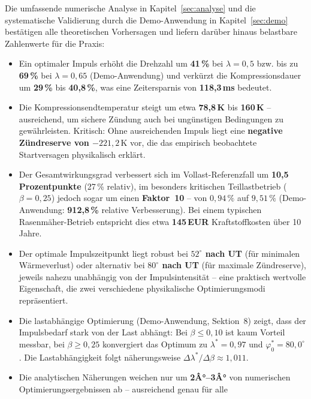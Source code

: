 ﻿\documentclass[a4paper,12pt]{article}
\begin{document}
Die umfassende numerische Analyse in Kapitel~\ref{sec:analyse} und die
systematische Validierung durch die Demo-Anwendung in Kapitel~\ref{sec:demo}
bestätigen alle theoretischen Vorhersagen und liefern darüber hinaus
belastbare Zahlenwerte für die Praxis:

\begin{itemize}
  \item Ein optimaler Impuls erhöht die Drehzahl um \textbf{41\,\%} bei
    $\lambda = 0{,}5$ bzw. bis zu \textbf{69\,\%} bei $\lambda = 0{,}65$
    (Demo-Anwendung) und verkürzt die Kompressionsdauer um \textbf{29\,\%}
    bis \textbf{40{,}8\,\%}, was eine Zeitersparnis von \textbf{118{,}3\,ms}
    bedeutet.
  \item Die Kompressionsendtemperatur steigt um etwa \textbf{78{,}8\,K} bis
    \textbf{160\,K} -- ausreichend, um sichere Zündung auch bei ungünstigen
    Bedingungen zu gewährleisten. Kritisch: Ohne ausreichenden Impuls liegt
    eine \textbf{negative Zündreserve von $-221{,}2\,\text{K}$} vor, die
    das empirisch beobachtete Startversagen physikalisch erklärt.
  \item Der Gesamtwirkungsgrad verbessert sich im Vollast-Referenzfall
    um \textbf{10{,}5 Prozentpunkte} (27\,\% relativ), im besonders
    kritischen Teillastbetrieb ($\beta = 0{,}25$) jedoch sogar um einen
    \textbf{Faktor~10} -- von $0{,}94\,\%$ auf $9{,}51\,\%$ (Demo-Anwendung:
    \textbf{912{,}8\,\%} relative Verbesserung). Bei einem typischen
    Rasenmäher-Betrieb entspricht dies etwa \textbf{145\,EUR} Kraftstoffkosten
    über 10 Jahre.
  \item Der optimale Impulszeitpunkt liegt robust bei \textbf{$52^\circ$ nach UT}
    (für minimalen Wärmeverlust) oder alternativ bei \textbf{$80^\circ$ nach UT}
    (für maximale Zündreserve), jeweils nahezu unabhängig von der Impulsintensität
    -- eine praktisch wertvolle Eigenschaft, die zwei verschiedene physikalische
    Optimierungsmodi repräsentiert.
  \item Die lastabhängige Optimierung (Demo-Anwendung, Sektion~8) zeigt,
    dass der Impulsbedarf stark von der Last abhängt: Bei $\beta \leq 0{,}10$
    ist kaum Vorteil messbar, bei $\beta \geq 0{,}25$ konvergiert das
    Optimum zu $\lambda^* = 0{,}97$ und $\varphi_0^* = 80{,}0^\circ$.
    Die Lastabhängigkeit folgt näherungsweise $\Delta\lambda^*/\Delta\beta \approx 1{,}011$.
  \item Die analytischen Näherungen weichen nur um \textbf{2Â°--3Â°} von
    numerischen Optimierungsergebnissen ab -- ausreichend genau für alle

\end{itemize}
\end{document}
